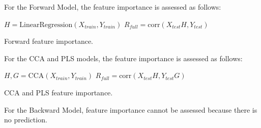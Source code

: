 For the Forward Model, the feature importance is assessed as follows:

\begin{algorithm}[H]
      $H = \text{LinearRegression}(X_{train},
Y_{train})$\; $R_{full} = \text{corr}(X_{test} H, Y_{test})$\;

     
\caption{Forward feature importance.} \label{algorithm:fwd_fi} \end{algorithm}


For the CCA and PLS models, the feature importance is assessed as follows:

\begin{algorithm}[H]
      $H, G = \text{CCA}(X_{train},
Y_{train})$\; $R_{full} = \text{corr}(X_{test} H, Y_{test} G)$\;

     
\caption{CCA and PLS feature importance.} \label{algorithm:cdp_fi}
\end{algorithm}

For the Backward Model, feature importance cannot be assessed because there is no prediction.
